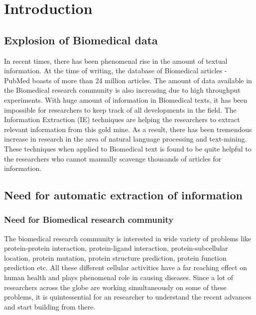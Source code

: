 \chapter{Introduction}\label{chapter:introduction}

\section{Explosion of Biomedical data}

In recent times, there has been phenomenal rise in the amount of textual information. At the time of writing, the database of Biomedical articles - PubMed boasts of more than 24 million articles. The amount of data available in the Biomedical research community is also increasing due to high throughput experiments. With huge amount of information in Biomedical texts, it has been impossible for researchers to keep track of all developments in the field. The Information Extraction (IE) techniques are helping the researchers to extract relevant information from this gold mine. As a result, there has been tremendous increase in research in the area of natural language processing and text-mining. These techniques when applied to Biomedical text is found to be quite helpful to the researchers who cannot manually scavenge thousands of articles for information.


\section{Need for automatic extraction of information}

\subsection*{Need for Biomedical research community}
The biomedical research community is interested in wide variety of problems like protein-protein interaction, protein-ligand interaction, protein-subcellular location, protein mutation, protein structure prediction, protein function prediction etc. All these different cellular activities have a far reaching effect on human health and plays phenomenal role in causing diseases. Since a lot of researchers across the globe are working simultaneously on some of these problems, it is quintessential for an researcher to understand the recent advances and start building from there. 

